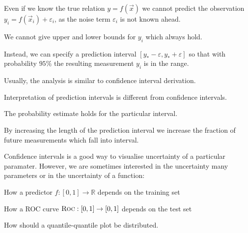\documentclass[landscape,footrule]{foils}
\begin{document}

Even if we know the true relation $y=f(\vec{x})$ we cannot predict the observation $y_{i}=f(\vec{x}_i)+\varepsilon_i$, as the noise term $\varepsilon_{i}$ is not known ahead.
\begin{triangles}
\item We cannot give upper and lower bounds for $y_i$ which always hold.
\end{triangles}
\vspace*{4ex}

Instead, we can specify a prediction interval $[y_*-\varepsilon, y_*+\varepsilon]$ so that with probability $95\%$ the resulting measurement $y_i$ is in the range.
\begin{triangles}
\item Usually, the analysis is similar to confidence interval derivation.
\end{triangles}  
\vspace*{4ex}

Interpretation of prediction intervals is different from confidence intervals.

\begin{triangles}
\item The probability estimate holds for the particular interval.
\end{triangles}  



By increasing the length of the prediction interval we increase the fraction of future measurements which fall into interval.




Confidence intervals is a good way to visualise uncertainty of a particular paramater.
However, we are sometimes interested in the uncertainty many parameters or in the uncertainty of a function:
\begin{triangles}
\item How a predictor $f:[0,1]\to\mathbb{R}$ depends on the training set
\item How a ROC curve $\textsc{Roc}:[0,1]\to[0,1]$ depends on the test set
\item How should a quantile-quantile plot be distributed.
\end{triangles}
\vspace*{4ex}
\end{document}
